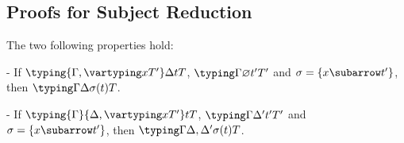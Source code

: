 \subsection{Proofs for Subject Reduction}

\begin{lemma}
  The two following properties hold:

  - If $\typing {\Gamma, \vartyping x T'} \Delta t T$, $\typing
  \Gamma \varnothing {t'} T'$ and $\sigma = \{x \subarrow t'\}$, then
  $\typing \Gamma \Delta {\sigma(t)} T$.

  - If $\typing {\Gamma} {\Delta, \vartyping x T'} t T$, $\typing
  \Gamma {\Delta'} {t'} T'$ and $\sigma = \{x \subarrow t'\}$, then
  $\typing \Gamma {\Delta, \Delta'} {\sigma(t)} T$.
\end{lemma}

